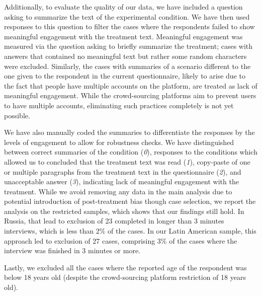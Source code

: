 \documentclass[11pt, ngerman,english,a4]{article}
\begin{document}
Additionally, to evaluate the quality of our data, we have included a question asking to summarize the text of the experimental condition. We have then used responses to this question to filter the cases where the respondents failed to show meaningful engagement with the treatment text. Meaningful engagement was measured via the question asking to briefly summarize the treatment; cases with answers that contained no meaningful text but rather some random characters were excluded. Similarly, the cases with summaries of a scenario different to the one given to the respondent in the current questionnaire, likely to arise due to the fact that people have multiple accounts on the platform, are treated as lack of meaningful engagement.  While the crowd-sourcing platforms aim to prevent users to have multiple accounts, eliminating such practices completely is not yet possible. 

We have also manually coded the summaries to differentiate the responses by the levels of engagement to allow for robustness checks. We have distinguished between correct summaries of the condition (\textit{0}), responses to the conditions which allowed us to concluded that the treatment text was read (\textit{1}), copy-paste of one or multiple paragraphs from the treatment text in the questionnaire (\textit{2}), and unacceptable answer (\textit{3}), indicating lack of meaningful engagement with the treatment. While we avoid removing any data in the main analysis due to potential introduction of post-treatment bias though case selection, we report the analysis on the restricted samples, which shows that our findings still hold. 
In Russia, that lead to exclusion of 23 completed in longer than 3 minutes interviews, which is less than 2\% of the cases. In our Latin American sample, this approach led to exclusion of 27 cases, comprising 3\% of the cases where the interview was finished in 3 minutes or more. 

Lastly, we excluded all the cases where the reported age of the respondent was below 18 years old (despite the crowd-sourcing platform restriction of 18 years old). 


\end{document}
